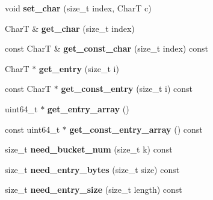 \begin{CompactItemize}
\item 
\hypertarget{classdeque__string_417895022e2d66b2ca86160e4a816449}{
void \textbf{set\_\-char} (size\_\-t index, CharT c)}
\label{classdeque__string_417895022e2d66b2ca86160e4a816449}

\item 
\hypertarget{classdeque__string_0befe97d49e2fea9e6822c03b06f5320}{
CharT \& \textbf{get\_\-char} (size\_\-t index)}
\label{classdeque__string_0befe97d49e2fea9e6822c03b06f5320}

\item 
\hypertarget{classdeque__string_33109737d609410fe6cf12bd1ecf3d8b}{
const CharT \& \textbf{get\_\-const\_\-char} (size\_\-t index) const }
\label{classdeque__string_33109737d609410fe6cf12bd1ecf3d8b}

\item 
\hypertarget{classdeque__string_cf57132cb72e77ced273a190418fabe6}{
CharT $\ast$ \textbf{get\_\-entry} (size\_\-t i)}
\label{classdeque__string_cf57132cb72e77ced273a190418fabe6}

\item 
\hypertarget{classdeque__string_42993f9e27869b796233e28e09bcac74}{
const CharT $\ast$ \textbf{get\_\-const\_\-entry} (size\_\-t i) const }
\label{classdeque__string_42993f9e27869b796233e28e09bcac74}

\item 
\hypertarget{classdeque__string_a0bb8bb5ac55d1d55c3ba10f3d931320}{
uint64\_\-t $\ast$ \textbf{get\_\-entry\_\-array} ()}
\label{classdeque__string_a0bb8bb5ac55d1d55c3ba10f3d931320}

\item 
\hypertarget{classdeque__string_e1ae6b5f35aa106a39c1f5523572ef07}{
const uint64\_\-t $\ast$ \textbf{get\_\-const\_\-entry\_\-array} () const }
\label{classdeque__string_e1ae6b5f35aa106a39c1f5523572ef07}

\item 
\hypertarget{classdeque__string_e6a3701ee0ed154b07eb18cbfd13c463}{
size\_\-t \textbf{need\_\-bucket\_\-num} (size\_\-t k) const }
\label{classdeque__string_e6a3701ee0ed154b07eb18cbfd13c463}

\item 
\hypertarget{classdeque__string_0c286fb4f2c9590764026d620a4ed847}{
size\_\-t \textbf{need\_\-entry\_\-bytes} (size\_\-t size) const }
\label{classdeque__string_0c286fb4f2c9590764026d620a4ed847}

\item 
\hypertarget{classdeque__string_65d10fcddd0820ff314e983e140c44bf}{
size\_\-t \textbf{need\_\-entry\_\-size} (size\_\-t length) const }
\label{classdeque__string_65d10fcddd0820ff314e983e140c44bf}


\end{CompactItemize}
